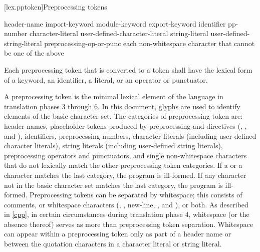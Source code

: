 [lex.pptoken]{Preprocessing tokens}

%
\begin{bnf}
\br
    header-name\br
    import-keyword\br
    module-keyword\br
    export-keyword\br
    identifier\br
    pp-number\br
    character-literal\br
    user-defined-character-literal\br
    string-literal\br
    user-defined-string-literal\br
    preprocessing-op-or-punc\br
    \textnormal{each non-whitespace character that cannot be one of the above}
\end{bnf}

\pnum
Each preprocessing token that is converted to a token
shall have the lexical form of a keyword, an identifier, a literal,
or an operator or punctuator.

\pnum
A preprocessing token is the minimal lexical element of the language in translation
phases 3 through 6.
In this document,
glyphs are used to identify
elements of the basic character set.
The categories of preprocessing token are: header names,
placeholder tokens produced by preprocessing  and  directives
(, , and ),
identifiers, preprocessing numbers, character literals (including user-defined character
literals), string literals (including user-defined string literals), preprocessing
operators and punctuators, and single non-whitespace characters that do not lexically
match the other preprocessing token categories.
If a  or a  character
matches the last category, the program is ill-formed.
If any character not in the basic character set matches the last category,
the program is ill-formed.
Preprocessing tokens can be separated by
%
whitespace;
%
this consists of comments, or whitespace characters
(,
,
new-line,
, and
), or both.
As described in \ref{cpp}, in certain
circumstances during translation phase 4, whitespace (or the absence
thereof) serves as more than preprocessing token separation. Whitespace
can appear within a preprocessing token only as part of a header name or
between the quotation characters in a character literal or
string literal.

